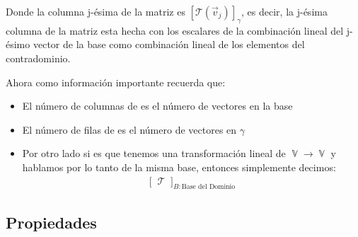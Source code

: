 \documentclass[12pt, fleqn]{report}                             %
\theoremstyle{break}                                            %
\DeclareMathOperator \VectorSet    {\mathbb{V}}                 %
\DeclareMathOperator \LinTrans      {\mathcal{T}}               %
\newcommand{\Wrap}[1]           {\left( #1 \right)}             %
\newcommand{\Brackets}[1]       {\left[ #1 \right]}             %
\newcommand{\BigBrackets}[1]    {\Big[ \; #1 \; \Big]}          %
\newcommand{\FnLinTrans}[1]{\mathcal{T}\Wrap{#1}}               %
\begin{document}
                Donde la columna j-ésima de la matriz es $\Brackets{\FnLinTrans{\vec v_j}}_{\gamma}$,
                es decir, la j-ésima columna de la matriz esta hecha con los escalares de la combinación
                lineal del j-ésimo vector de la base como combinación lineal de los elementos del contradominio.

                Ahora como información importante recuerda que:
                \begin{itemize}
                    \item 
                        El número de columnas de es el número de vectores en la base
                    \item 
                        El número de filas de es el número de vectores en $\gamma$
                    \item
                        Por otro lado si es que tenemos una transformación lineal de $\VectorSet \to \VectorSet$
                        y hablamos por lo tanto de la misma base, entonces simplemente decimos:
                        \begin{align*}
                        \BigBrackets{\LinTrans}_{B: \text{Base del Dominio}}
                    \end{align*}
                \end{itemize}


            \clearpage
            \subsection{Propiedades}
\end{document}
